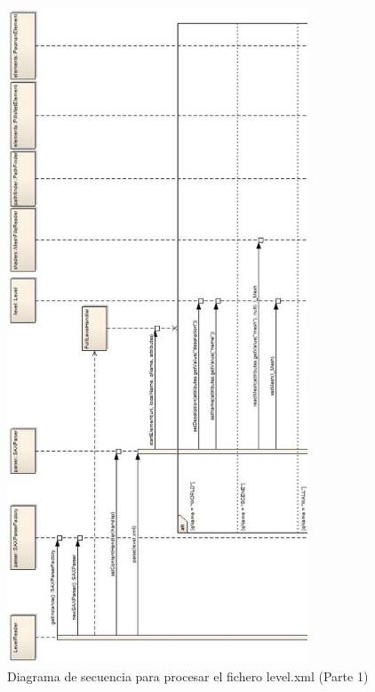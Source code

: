 \begin{figure}[h!]
\centering
\includegraphics[height=19.5cm]{img/uml/LevelReaderRead1.jpg}	
\caption{Diagrama de secuencia para procesar el fichero level.xml (Parte 1)}
\end{figure}

